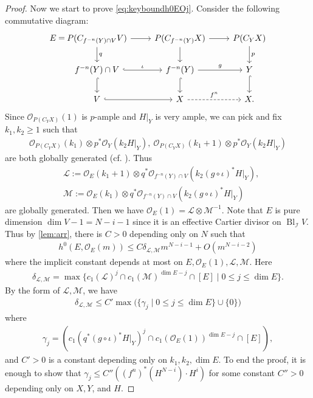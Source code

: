 \documentclass[12pt]{amsart}
\theoremstyle{plain}
\theoremstyle{definition}
\numberwithin{equation}{section}
\def\O{{ \mathcal{O}}}
\def\I{{ \mathcal{I}}}
\def\L{{ \mathcal{L}}}
\def\M{{ \mathcal{M}}}
\DeclareMathOperator{\Bl}{Bl}
\newcommand{\g}{\gamma}
\renewcommand{\d}{\delta}
\begin{document}
\begin{proof}
Now we start to prove \cref{eq:keyboundh0EOj}.
Consider the following commutative diagram:
\begin{equation}
\begin{tikzcd}
E \arrow[r,phantom,"="] &[-2em] P(C_{f^{-n}(Y)\cap V} V) \arrow[d,"q"] \arrow[r] & P(C_{f^{-n}(Y)}X) \arrow[d] \arrow[r] 
& P(C_{Y}X) \arrow[d,"p"] \\
& f^{-n}(Y)\cap V \arrow[d,hook] \arrow[r,hook,"\iota"] &  f^{-n}(Y) \arrow[d,hook]  \arrow[r,"g"] & Y \arrow[d,hook] \\
& V \arrow[r,hook] & X \arrow[r,"f^{n}",dashed] & X .
\end{tikzcd}
\end{equation}
Since $\O_{P(C_{Y}X)}(1)$ is $p$-ample and $H|_{Y}$ is very ample,
we can pick and fix $k_{1},k_{2} \geq 1$ such that
\begin{align}
\O_{P(C_{Y}X)}(k_{1}) \otimes p^{*}\O_{Y}(k_{2}H|_{Y}),\ \O_{P(C_{Y}X)}(k_{1}+1) \otimes p^{*}\O_{Y}(k_{2}H|_{Y})
\end{align}
are both globally generated (cf. \cite[Part One, 1, 1.7]{Lazpos1}).
Thus 
\begin{align}
&\L :=\O_{E}(k_{1}+1) \otimes q^{*}\O_{f^{-n}(Y) \cap V}(k_{2}(g \circ \iota)^{*}H|_{Y}),\\
&\M := \O_{E}(k_{1}) \otimes q^{*}\O_{f^{-n}(Y) \cap V}(k_{2}(g \circ \iota)^{*}H|_{Y})
\end{align}
are globally generated.
Then we have $\O_{E}(1) = \L \otimes \M^{-1}$.
Note that $E$ is pure dimension $\dim V - 1 = N-i-1$ since it is an effective Cartier divisor on $\Bl_{\I}V$.
Thus by \cref{lem:arr}, there is $C > 0$ depending only on $N$ such that
\begin{align}
h^{0}(E, \O_{E}(m)) \leq C \d_{\L, \M} m^{N-i-1} + O(m^{N-i-2})
\end{align}
where the implicit constant depends at most on $E, \O_{E}(1), \L, \M$.
Here 
\begin{align}
\d_{\L,\M} = \max\{ c_{1}(\L)^{j}\cap c_{1}(\M)^{\dim E - j} \cap [E] \mid 0 \leq j \leq \dim E \}.
\end{align}
By the form of $\L, \M$, we have
\begin{align}
\d_{\L,\M} \leq C' \max\big( \{ \g_{j} \mid 0 \leq j \leq \dim E\} \cup \{0\}\big)
\end{align}
where
\begin{align}
\g_{j} = ( c_{1}(q^{*} (g \circ \iota)^{*}H|_{Y})^{j} \cap c_{1}(\O_{E}(1))^{\dim E - j} \cap [E]  ),
\end{align}
and $C' > 0$ is a constant depending only on $k_{1}, k_{2}, \dim E$.
To end the proof, it is enough to show that $\g_{j} \leq C'' ((f^{n})^{*}(H^{N-i}) \cdot H^{i})$
for some constant $C'' > 0$ depending only on $X, Y$, and $H$.



\end{proof}
\end{document}
